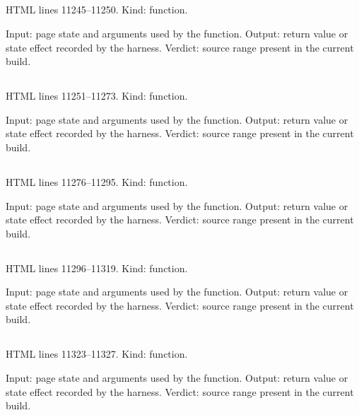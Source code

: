 \subsection*{\texttt{}}
\label{vf_622_selCsvTemplate}
HTML lines 11245--11250. Kind: function.

Input: page state and arguments used by the function.
Output: return value or state effect recorded by the harness.
Verdict: source range present in the current build.

\subsection*{\texttt{}}
\label{vf_623_selApplyCsv}
HTML lines 11251--11273. Kind: function.

Input: page state and arguments used by the function.
Output: return value or state effect recorded by the harness.
Verdict: source range present in the current build.

\subsection*{\texttt{}}
\label{vf_624_selZipEntries}
HTML lines 11276--11295. Kind: function.

Input: page state and arguments used by the function.
Output: return value or state effect recorded by the harness.
Verdict: source range present in the current build.

\subsection*{\texttt{}}
\label{vf_625_selReadme}
HTML lines 11296--11319. Kind: function.

Input: page state and arguments used by the function.
Output: return value or state effect recorded by the harness.
Verdict: source range present in the current build.

\subsection*{\texttt{}}
\label{vf_626_selWithExportNames}
HTML lines 11323--11327. Kind: function.

Input: page state and arguments used by the function.
Output: return value or state effect recorded by the harness.
Verdict: source range present in the current build.


